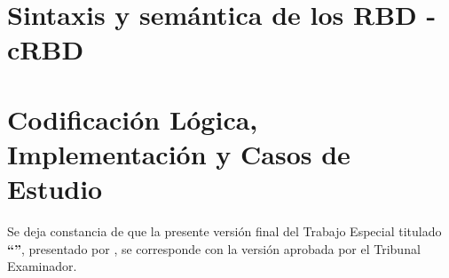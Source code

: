 \documentclass[spanish,a4paper,oneside,12pt,openright]{book}
\begin{document}
 \cleardoublepage

\part{Sintaxis y semántica de los RBD - cRBD}
\label{part:modelado}

 \cleardoublepage

 \cleardoublepage

\part{Codificación Lógica, Implementación y Casos de Estudio}
\label{part:codificacion_herramienta}

 \cleardoublepage

 \cleardoublepage

 \cleardoublepage

 \cleardoublepage








\cleardoublepage
{}



\cleardoublepage
\thispagestyle{empty}
\vspace*{3cm}
\noindent
Se deja constancia de que la presente versión final del Trabajo Especial titulado \textbf{``\tfcTitle''}, presentado por \textbf{\tfcAuthor}, se corresponde con la versión aprobada por el Tribunal Examinador.
\end{document}
